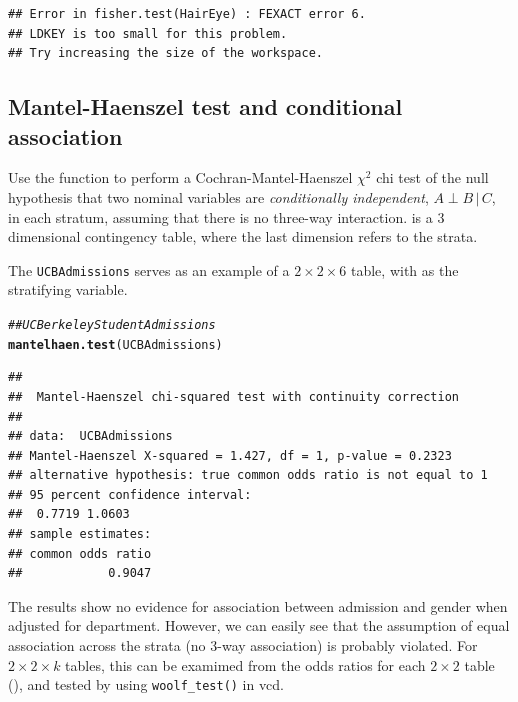 \documentclass[10pt,twoside]{article}\usepackage[]{graphicx}\usepackage[]{color}
\makeatletter
\newcommand{\hlcom}[1]{\textcolor[rgb]{0.678,0.584,0.686}{\textit{#1}}}%
\newcommand{\hlstd}[1]{\textcolor[rgb]{0.345,0.345,0.345}{#1}}%
\newcommand{\hlkwd}[1]{\textcolor[rgb]{0.737,0.353,0.396}{\textbf{#1}}}%
\newenvironment{kframe}{%
 \def\at@end@of@kframe{}%
 \ifinner\ifhmode%
  \def\at@end@of@kframe{\end{minipage}}%
  \begin{minipage}{\columnwidth}%
 \fi\fi%
 \def\FrameCommand##1{\hskip\@totalleftmargin \hskip-\fboxsep
 \colorbox{shadecolor}{##1}\hskip-\fboxsep
     \hskip-\linewidth \hskip-\@totalleftmargin \hskip\columnwidth}%
 \MakeFramed {\advance\hsize-\width
   \@totalleftmargin\z@ \linewidth\hsize
   \@setminipage}}%
 {\par\unskip\endMakeFramed%
 \at@end@of@kframe}
\newenvironment{knitrout}{}{} %
\newcommand*{\given}{\ensuremath{\, | \,}}
\newcommand{\data}[1]{\texttt{#1}}
\newcommand{\codefun}[1]{\code{#1()}}
\newcommand{\pkg}[1]{{\normalfont\fontseries{b}\selectfont #1}}
\makeatother
\begin{document}
\begin{verbatim}
## Error in fisher.test(HairEye) : FEXACT error 6.
## LDKEY is too small for this problem.
## Try increasing the size of the workspace.
\end{verbatim}

\subsection[Mantel-Haenszel test]{Mantel-Haenszel test and conditional association}\label{sec:mantel}

Use the   function  to perform  a Cochran-Mantel-Haenszel 
$\chi^2$ chi
test  of   the  null  hypothesis   that  two  nominal   variables  are
\emph{conditionally independent}, $A \perp B \given C$, in each stratum,  assuming that there is no  three-way
interaction.  is  a 3 dimensional  contingency table, where  the last dimension
refers to the strata.

The \data{UCBAdmissions} serves as an example of a $2 \times 2 \times 6$ table,
with  as the stratifying variable.
\begin{knitrout}
\color{fgcolor}\begin{kframe}
\begin{alltt}
\hlcom{## UC Berkeley Student Admissions}
\hlkwd{mantelhaen.test}\hlstd{(UCBAdmissions)}
\end{alltt}
\begin{verbatim}
## 
## 	Mantel-Haenszel chi-squared test with continuity correction
## 
## data:  UCBAdmissions
## Mantel-Haenszel X-squared = 1.427, df = 1, p-value = 0.2323
## alternative hypothesis: true common odds ratio is not equal to 1
## 95 percent confidence interval:
##  0.7719 1.0603
## sample estimates:
## common odds ratio 
##            0.9047
\end{verbatim}
\end{kframe}
\end{knitrout}

The results show no evidence for association between admission and gender
when adjusted for department.  However, we can easily see that the assumption
of equal association across the strata (no 3-way association) is probably
violated. For $2 \times 2 \times k$ tables, this can be examimed
from the odds ratios for each $2 \times 2$ table (\codefun{oddsratio}), and
tested 
by  using
\verb|woolf_test()| in \pkg{vcd}.
\end{document}
